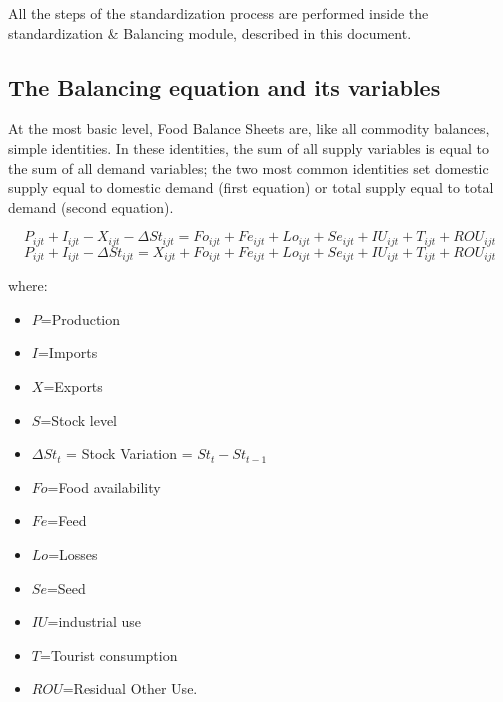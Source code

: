 \documentclass[]{article}
\providecommand{\tightlist}{%
  \setlength{\itemsep}{0pt}\setlength{\parskip}{0pt}}
\begin{document}
All the steps of the standardization process are performed inside the
standardization \& Balancing module, described in this document.

\subsection{The Balancing equation and its
variables}\label{the-balancing-equation-and-its-variables}

At the most basic level, Food Balance Sheets are, like all commodity
balances, simple identities. In these identities, the sum of all supply
variables is equal to the sum of all demand variables; the two most
common identities set domestic supply equal to domestic demand (first
equation) or total supply equal to total demand (second equation).

\begin{equation}
\label{eq:balance1}
P_{ijt} + I_{ijt} - X_{ijt} - \Delta St_{ijt} = Fo_{ijt} + Fe_{ijt} + Lo_{ijt} + Se_{ijt} + IU_{ijt} + T_{ijt}  + ROU_{ijt}
\end{equation}\begin{equation}
\label{eq:balance2}
P_{ijt} + I_{ijt} - \Delta St_{ijt} = X_{ijt} + Fo_{ijt} + Fe_{ijt} + Lo_{ijt} + Se_{ijt} + IU_{ijt} + T_{ijt} + ROU_{ijt}
\end{equation}

where:

\begin{itemize}
\tightlist
\item
  \(P\)=Production
\item
  \(I\)=Imports
\item
  \(X\)=Exports
\item
  \(S\)=Stock level
\item
  \(\Delta St_{t}\) = Stock Variation = \(St_{t} - St_{t-1}\)
\item
  \(Fo\)=Food availability
\item
  \(Fe\)=Feed
\item
  \(Lo\)=Losses
\item
  \(Se\)=Seed
\item
  \(IU\)=industrial use
\item
  \(T\)=Tourist consumption
\item
  \(ROU\)=Residual Other Use.
\end{itemize}
\end{document}
